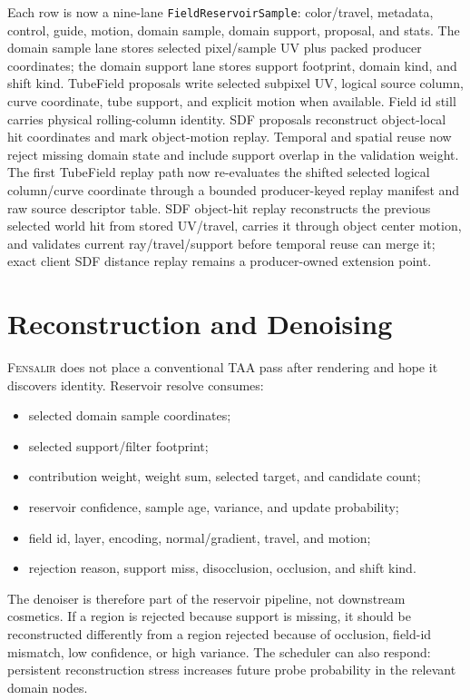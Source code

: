 \documentclass[11pt]{article}
\newcommand{\Fensalir}{\textsc{Fensalir}}
\begin{document}
Each row is now a nine-lane \texttt{FieldReservoirSample}: color/travel,
metadata, control, guide, motion, domain sample, domain support, proposal, and
stats.  The domain sample lane stores selected pixel/sample UV plus packed
producer coordinates; the domain support lane stores support footprint, domain
kind, and shift kind.  TubeField proposals write selected subpixel UV,
logical source column, curve coordinate, tube support, and explicit motion when
available.  Field id still carries physical rolling-column identity.  SDF
proposals reconstruct object-local hit coordinates and mark object-motion
replay.  Temporal and spatial reuse now reject missing domain state and include
support overlap in the validation weight.  The first TubeField replay path
now re-evaluates the shifted selected logical column/curve coordinate through
a bounded producer-keyed replay manifest and raw source descriptor table.  SDF object-hit
replay reconstructs the previous selected world hit from stored UV/travel,
carries it through object center motion, and validates current ray/travel/support
before temporal reuse can merge it; exact client SDF distance replay remains a
producer-owned extension point.

\section{Reconstruction and Denoising}

\Fensalir{} does not place a conventional TAA pass after rendering and hope it
discovers identity.  Reservoir resolve consumes:

\begin{itemize}[leftmargin=1.5em]
  \item selected domain sample coordinates;
  \item selected support/filter footprint;
  \item contribution weight, weight sum, selected target, and candidate count;
  \item reservoir confidence, sample age, variance, and update probability;
  \item field id, layer, encoding, normal/gradient, travel, and motion;
  \item rejection reason, support miss, disocclusion, occlusion, and shift kind.
\end{itemize}

The denoiser is therefore part of the reservoir pipeline, not downstream
cosmetics.  If a region is rejected because support is missing, it should be
reconstructed differently from a region rejected because of occlusion, field-id
mismatch, low confidence, or high variance.  The scheduler can also respond:
persistent reconstruction stress increases future probe probability in the
relevant domain nodes.
\end{document}
